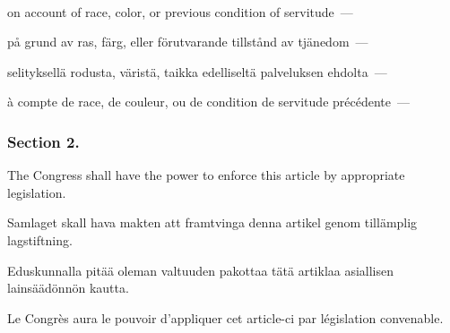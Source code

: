 \documentclass[a4,landscape,12pt]{article}
\begin{document}
~

\begin{minipage}[t]{0.22\textwidth}
on account of race, color, or previous condition of servitude~---
\end{minipage}\textwidth
\begin{minipage}[t]{0.22\textwidth}
på grund av ras, färg, eller förutvarande tillstånd av tjänedom~---
\end{minipage}\textwidth
\begin{minipage}[t]{0.22\textwidth}
selityksellä rodusta, väristä, taikka edelliseltä palveluksen ehdolta~---
\end{minipage}\textwidth
\begin{minipage}[t]{0.22\textwidth}
à compte de race, de couleur, ou de condition de servitude précédente~---
\end{minipage}

\subsubsection*{Section 2.}
\begin{minipage}[t]{0.22\textwidth}
The Congress shall have the power to enforce this article by appropriate legislation.
\end{minipage}\textwidth
\begin{minipage}[t]{0.22\textwidth}
Samlaget skall hava makten att framtvinga denna artikel genom tillämplig lagstiftning.
\end{minipage}\textwidth
\begin{minipage}[t]{0.22\textwidth}
Eduskunnalla pitää oleman valtuuden pakottaa tätä artiklaa asiallisen lainsäädönnön kautta.
\end{minipage}\textwidth
\begin{minipage}[t]{0.22\textwidth}
Le Congrès aura le pouvoir d'appliquer cet article-ci par législation convenable.
\end{minipage}

~
\end{document}
